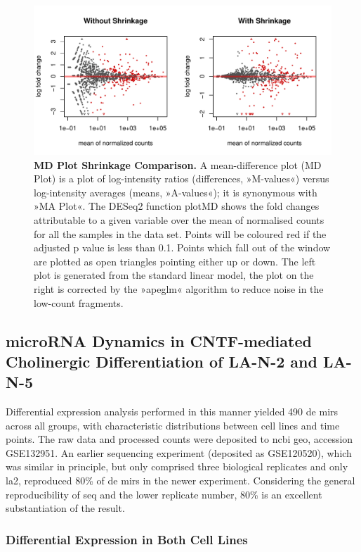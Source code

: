 \begin{figure}
\centering
\includegraphics[width=\textwidth]{figures/apeglm-comp-la2d4}
\caption[MD Plot Shrinkage Comparison.]{\textbf{MD Plot Shrinkage Comparison.} A mean-difference plot (MD Plot) is a plot of log-intensity ratios (differences, »M-values«) versus log-intensity averages (means, »A-values«); it is synonymous with »MA Plot«. The DESeq2 function plotMD shows the fold changes attributable to a given variable over the mean of normalised counts for all the samples in the data set. Points will be coloured red if the adjusted p value is less than 0.1. Points which fall out of the window are plotted as open triangles pointing either up or down. The left plot is generated from the standard linear model, the plot on the right is corrected by the »apeglm« algorithm\cite{Zhu2019} to reduce noise in the low-count fragments.
\label{fig:apeglm-comp-la2d4}}
\end{figure}

\subsection{microRNA Dynamics in CNTF-mediated Cholinergic Differentiation of LA-N-2 and LA-N-5}
Differential expression analysis performed in this manner yielded 490 \ac{de} \acp{mir} across all groups, with characteristic distributions between cell lines and time points. The raw data and processed counts were deposited to \ac{ncbi} \ac{geo}, accession GSE132951. An earlier sequencing experiment (deposited as GSE120520), which was similar in principle, but only comprised three biological replicates and only \ac{la2}, reproduced 80\% of \ac{de} \acp{mir} in the newer experiment. Considering the general reproducibility of \ac{seq} and the lower replicate number, 80\% is an excellent substantiation of the result.

\subsubsection{Differential Expression in Both Cell Lines}

